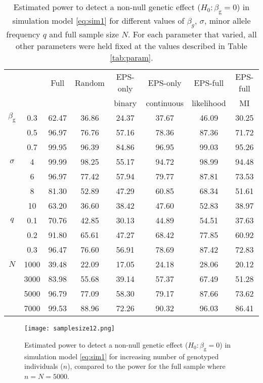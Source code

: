 \documentclass[10pt,a4paper]{article}
\begin{document}
\begin{table}[p]
\centering
	\begin{tabular}{cccccccc}
	\hline
	\rule{0pt}{2.5ex}
	 & & Full & Random & EPS-only & EPS-only & EPS-full & EPS-full \\
	 & & & & binary & continuous & likelihood & MI \\
	\hline
	\rule{0pt}{2.5ex}
	$\beta_{\text{g}}$ & 0.3 & 62.47 & 36.86 & 24.37 & 37.67 & 46.09 & 30.25 \\ 
  & 0.5 & 96.97 & 76.76 & 57.16 & 78.36 & 87.36 & 71.72 \\ 
  & 0.7 & 99.95 & 96.39 & 84.86 & 96.95 & 99.03 & 95.26 \\ 
	\rule{0pt}{3ex}
 $\sigma$ &4 & 99.99 & 98.25 & 55.17 & 94.72 & 98.99 & 94.48 \\ 
 & 6 & 96.97 & 77.42 & 57.94 & 79.77 & 87.81 & 73.53 \\ 
 & 8 & 81.30 & 52.89 & 47.29 & 60.85 & 68.34 & 51.61 \\ 
 & 10 & 63.20 & 36.60 & 38.42 & 47.60 & 52.83 & 38.97 \\ 
	\rule{0pt}{3ex}
 $q$&0.1 & 70.76 & 42.85 & 30.13 & 44.89 & 54.51 & 37.63 \\ 
  &0.2 & 91.80 & 65.61 & 47.27 & 68.42 & 77.85 & 60.92 \\ 
  &0.3 & 96.47 & 76.60 & 56.91 & 78.69 & 87.42 & 72.83 \\ 
 	\rule{0pt}{3ex}
 $N$&1000 & 39.48 & 22.09 & 17.05 & 24.18 & 28.06 & 20.12 \\ 
  &3000 & 83.98 & 55.68 & 39.14 & 57.37 & 67.49 & 51.28 \\ 
  &5000 & 96.79 & 77.09 & 58.30 & 79.17 & 87.66 & 73.62 \\ 
  &7000 & 99.53 & 88.96 & 72.26 & 90.32 & 96.03 & 86.41 \\ 
	\hline
	\end{tabular}
	\caption{Estimated power to detect a non-null genetic effect ($H_0: \beta_{\text{g}} = 0$) in simulation model \eqref{eq:sim1} for different values of $\beta_g$, $\sigma$, minor allele frequency $q$ and full sample size $N$. For each parameter that varied, all other parameters were held fixed at the values described in Table \ref{tab:param}.}
	\label{tab:sim1}
\end{table}

\begin{figure}[p]
	\centering
	\texttt{[image: samplesize12.png]}
	\caption{Estimated power to detect a non-null genetic effect ($H_0: \beta_{\text{g}} = 0$) in simulation model \eqref{eq:sim1} for increasing number of genotyped individuals ($n$), compared to the power for the full sample where $n=N=5000$.}
	\label{fig:samplesize1}
\end{figure}
\end{document}
